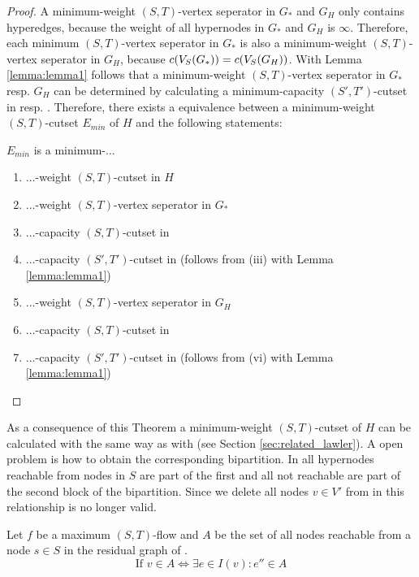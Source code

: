 \begin{proof}
A minimum-weight $(S,T)$-vertex seperator in $G_*$ and $G_H$ only contains hyperedges, because
the weight of all hypernodes in $G_*$ and $G_H$ is $\infty$. Therefore, each minimum
$(S,T)$-vertex seperator in $G_*$ is also a minimum-weight $(S,T)$-vertex seperator in $G_H$,
because $c(V_S(G_*)) = c(V_S(G_H))$. With Lemma \ref{lemma:lemma1} follows that
a minimum-weight $(S,T)$-vertex seperator in $G_*$ resp. $G_H$  can be determined by 
calculating a minimum-capacity $(S',T')$-cutset in  resp. . 
Therefore, there exists a equivalence between a minimum-weight $(S,T)$-cutset 
$E_{min}$ of $H$ and the following statements: 

$E_{min}$ is a minimum-$\ldots$
\begin{enumerate}
\item $\ldots$-weight $(S,T)$-cutset in $H$
\item $\ldots$-weight $(S,T)$-vertex seperator in $G_*$
\item $\ldots$-capacity $(S,T)$-cutset in 
\item $\ldots$-capacity $(S',T')$-cutset in  (follows from (iii) with Lemma \ref{lemma:lemma1})
\item $\ldots$-weight $(S,T)$-vertex seperator in $G_H$
\item $\ldots$-capacity $(S,T)$-cutset in 
\item $\ldots$-capacity $(S',T')$-cutset in  (follows from (vi) with Lemma \ref{lemma:lemma1})
\end{enumerate}

\end{proof}

As a consequence of this Theorem a minimum-weight $(S,T)$-cutset of $H$ can be calculated with
 the same way as with  (see Section \ref{sec:related_lawler}). A open
problem is how to obtain the corresponding bipartition. In  all hypernodes
reachable from nodes in $S$ are part of the first and all not reachable are part of the
second block of the bipartition. Since we delete all nodes $v \in V'$ from  
in  this relationship is no longer valid. 

\begin{lemma}
\label{lemma:bipartition_construction}
Let $f$ be a maximum $(S,T)$-flow and $A$ be the set of all nodes reachable
from a node $s \in S$ in the residual graph of .
\[ \text{If } v \in A \Leftrightarrow \exists e \in I(v): e'' \in A \]
\end{lemma}


